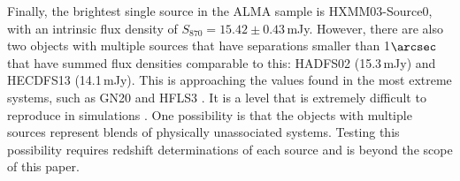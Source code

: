\documentclass[iop]{emulateapj}
\begin{document}

Finally, the brightest single source in the ALMA sample is HXMM03-Source0, with
an intrinsic flux density of $S_{870} = 15.42 \pm 0.43\,$mJy.  However, there
are also two objects with multiple sources that have separations smaller than
1$\arcsec$ that have summed flux densities comparable to this: HADFS02
(15.3$\,$mJy) and HECDFS13 (14.1$\,$mJy).  This is approaching the values found
in the most extreme systems, such as GN20
\citep[20.6$\,$mJy,][]{2006MNRAS.370.1185P} and HFLS3
\citep[15-20$\,$mJy;][]{Riechers:2013lr, Cooray:2014rm}.  It is a level that is
extremely difficult to reproduce in simulations
\citep[e.g.,][]{Narayanan:2010lr}.  One possibility is that the objects with
multiple sources represent blends of physically unassociated systems.  Testing
this possibility requires redshift determinations of each source and is beyond
the scope of this paper.
\end{document}
